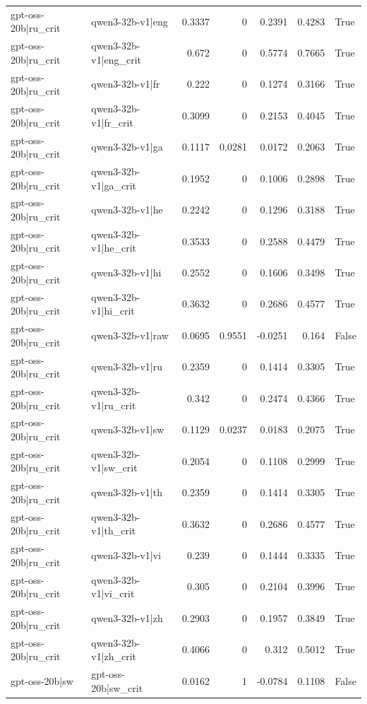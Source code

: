\begin{table}
\begin{tabular}{l l r r r r l}
gpt-oss-20b|ru_crit & qwen3-32b-v1|eng & 0.3337 & 0 & 0.2391 & 0.4283 & True \\
gpt-oss-20b|ru_crit & qwen3-32b-v1|eng_crit & 0.672 & 0 & 0.5774 & 0.7665 & True \\
gpt-oss-20b|ru_crit & qwen3-32b-v1|fr & 0.222 & 0 & 0.1274 & 0.3166 & True \\
gpt-oss-20b|ru_crit & qwen3-32b-v1|fr_crit & 0.3099 & 0 & 0.2153 & 0.4045 & True \\
gpt-oss-20b|ru_crit & qwen3-32b-v1|ga & 0.1117 & 0.0281 & 0.0172 & 0.2063 & True \\
gpt-oss-20b|ru_crit & qwen3-32b-v1|ga_crit & 0.1952 & 0 & 0.1006 & 0.2898 & True \\
gpt-oss-20b|ru_crit & qwen3-32b-v1|he & 0.2242 & 0 & 0.1296 & 0.3188 & True \\
gpt-oss-20b|ru_crit & qwen3-32b-v1|he_crit & 0.3533 & 0 & 0.2588 & 0.4479 & True \\
gpt-oss-20b|ru_crit & qwen3-32b-v1|hi & 0.2552 & 0 & 0.1606 & 0.3498 & True \\
gpt-oss-20b|ru_crit & qwen3-32b-v1|hi_crit & 0.3632 & 0 & 0.2686 & 0.4577 & True \\
gpt-oss-20b|ru_crit & qwen3-32b-v1|raw & 0.0695 & 0.9551 & -0.0251 & 0.164 & False \\
gpt-oss-20b|ru_crit & qwen3-32b-v1|ru & 0.2359 & 0 & 0.1414 & 0.3305 & True \\
gpt-oss-20b|ru_crit & qwen3-32b-v1|ru_crit & 0.342 & 0 & 0.2474 & 0.4366 & True \\
gpt-oss-20b|ru_crit & qwen3-32b-v1|sw & 0.1129 & 0.0237 & 0.0183 & 0.2075 & True \\
gpt-oss-20b|ru_crit & qwen3-32b-v1|sw_crit & 0.2054 & 0 & 0.1108 & 0.2999 & True \\
gpt-oss-20b|ru_crit & qwen3-32b-v1|th & 0.2359 & 0 & 0.1414 & 0.3305 & True \\
gpt-oss-20b|ru_crit & qwen3-32b-v1|th_crit & 0.3632 & 0 & 0.2686 & 0.4577 & True \\
gpt-oss-20b|ru_crit & qwen3-32b-v1|vi & 0.239 & 0 & 0.1444 & 0.3335 & True \\
gpt-oss-20b|ru_crit & qwen3-32b-v1|vi_crit & 0.305 & 0 & 0.2104 & 0.3996 & True \\
gpt-oss-20b|ru_crit & qwen3-32b-v1|zh & 0.2903 & 0 & 0.1957 & 0.3849 & True \\
gpt-oss-20b|ru_crit & qwen3-32b-v1|zh_crit & 0.4066 & 0 & 0.312 & 0.5012 & True \\
gpt-oss-20b|sw & gpt-oss-20b|sw_crit & 0.0162 & 1 & -0.0784 & 0.1108 & False \\

\end{tabular}
\end{table}
